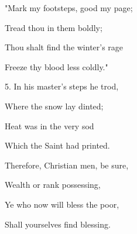 \begin{description}[nosep,leftmargin=\parindent,labelsep=0pt]
\item "Mark my footsteps, good my page; 
\item Tread thou in them boldly; 
\item Thou shalt find the winter's rage 
\item Freeze thy blood less coldly." 
\vspace{1.5ex}
\item 5. In his master's steps he trod, 
\item Where the snow lay dinted; 
\item Heat was in the very sod 
\item Which the Saint had printed. 
\item Therefore, Christian men, be sure, 
\item Wealth or rank possessing, 
\item Ye who now will bless the poor, 
\item Shall yourselves find blessing. 
\end{description}
